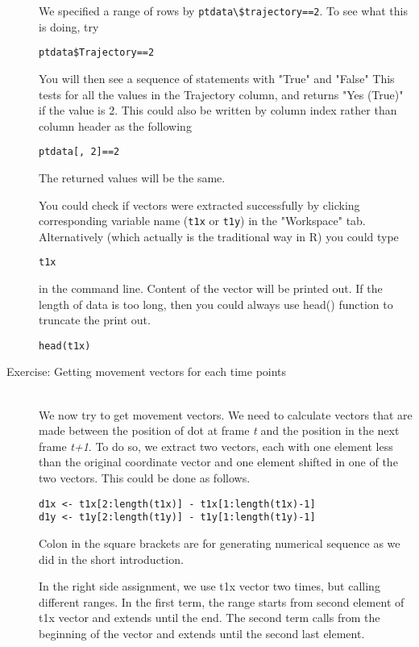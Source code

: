 \documentclass[11pnt]{article}
\begin{document}
\begin{description}
We specified a range of rows by \verb"ptdata\$trajectory==2". To see what this is doing, try 

\begin{verbatim}
ptdata$Trajectory==2
\end{verbatim}
You will then see a sequence of statements with "True" and "False"
This tests for all the values in the Trajectory column, and returns "Yes (True)" if the value is 2. This could also be written by column index rather than column header as the following
\begin{verbatim}
ptdata[, 2]==2
\end{verbatim}
The returned values will be the same. 

You could check if vectors were extracted successfully by clicking corresponding variable name (\verb"t1x" or \verb"t1y") in the "Workspace" tab. Alternatively (which actually is the traditional way in R) you could type
\begin{verbatim}
t1x
\end{verbatim}
in the command line. Content of the vector will be printed out. If the length of data is too long, then you could always use head() function to truncate the print out. 
\begin{verbatim}
head(t1x)
\end{verbatim}

\item[Exercise: Getting movement vectors for each time points]\hfill\\

We now try to get movement vectors. We need to calculate vectors that are made between the position of dot at frame \textit{t} and the position in the next frame \textit{t+1}. To do so, we extract two vectors, each with one element less than the original coordinate vector and one element shifted in one of the two vectors. This could be done as follows.  
\begin{verbatim}
d1x <- t1x[2:length(t1x)] - t1x[1:length(t1x)-1]
d1y <- t1y[2:length(t1y)] - t1y[1:length(t1y)-1]
\end{verbatim}

Colon in the square brackets are for generating numerical sequence as we did in the short introduction. 

In the right side assignment, we use t1x vector two times, but calling different ranges. In the first term, the range starts from second element of t1x vector and extends until the end. The second term calls from the beginning of the vector and extends until the second last element. 


\end{description}
\end{document}
